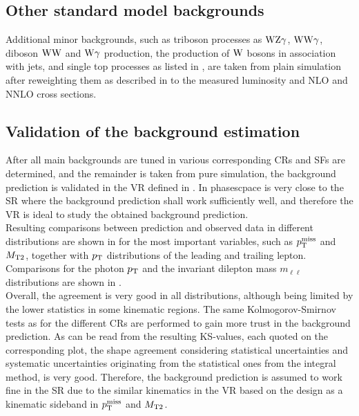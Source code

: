 \subsection{Other standard model backgrounds}
Additional minor backgrounds, such as triboson processes as $\mathrm{W}\mathrm{Z}\gamma$, $\mathrm{W}\mathrm{W}\gamma$, diboson $\mathrm{W}\mathrm{W}$ and $\mathrm{W}\gamma$ production, the production of $\mathrm{W}$ bosons in association with jets, and single top processes as listed in , are taken from plain simulation after reweighting them as described in  to the measured luminosity and NLO and NNLO cross sections.

\FloatBarrier
\subsection{Validation of the background estimation}\label{sec:Validation}
After all main backgrounds are tuned in various corresponding CRs and SFs are determined, and the remainder is taken from pure simulation, the background prediction is validated in the VR defined in . In phasescpace is very close to the SR where the background prediction shall work sufficiently well, and therefore the VR is ideal to study the obtained background prediction.\\
Resulting comparisons between prediction and observed data in different distributions are shown in  for the most important variables, such as $p_{\mathrm{T}}^\text{miss}$ and $M_{\mathrm{T2}}$, together with $p_{\mathrm{T}}$ distributions of the leading and trailing lepton. Comparisons for the photon $p_{\mathrm{T}}$ and the invariant dilepton mass $m_{\ell\ell}$ distributions are shown in .\\
Overall, the agreement is very good in all distributions, although being limited by the lower statistics in some kinematic regions. The same Kolmogorov-Smirnov tests as for the different CRs are performed to gain more trust in the background prediction. As can be read from the resulting KS-values, each quoted on the corresponding plot, the shape agreement considering statistical uncertainties and systematic uncertainties originating from the statistical ones from the integral method, is very good. Therefore, the background prediction is assumed to work fine in the SR due to the similar kinematics in the VR based on the design as a kinematic sideband in $p_{\mathrm{T}}^\text{miss}$ and $M_{\mathrm{T2}}$.
